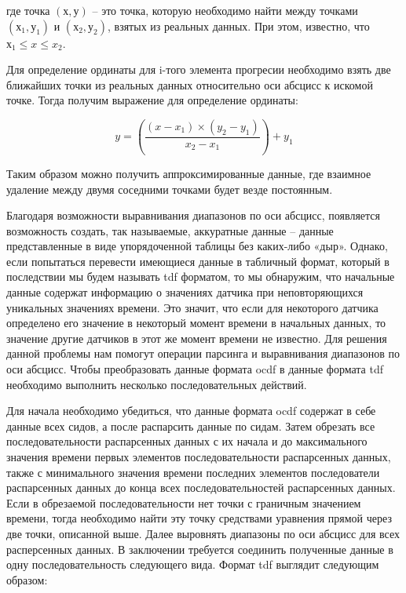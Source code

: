 {  \par \redline где точка $\left(х, у\right)$ – это точка, которую необходимо найти между точками $\left(х_1, у_1\right)$ и $\left(х_2, у_2\right)$, взятых из реальных данных. При этом, известно, что $х_1 \leq x \leq x_2$. 

  \par \redline Для определение ординаты для i-того элемента прогресии необходимо взять две ближайших точки из реальных данных относительно оси абсцисс к искомой точке. Тогда получим выражение для определение ординаты:

  \begin{equation} \tag{\thechaptercntr .\theformulacntr}
    y = \left(\frac{\left(x - x_1\right) \times \left(y_2 - y_1\right)}{x_2 - x_1}\right) + y_1
  \end{equation} \addtocounter{formulacntr}{1}

  \par \redline Таким образом можно получить аппроксимированные данные, где взаимное удаление между двумя соседними точками будет везде постоянным.  

  \par \redline Благодаря возможности выравнивания диапазонов по оси абсцисс, появляется возможность создать, так называемые, аккуратные данные – данные представленные в виде упорядоченной таблицы без каких-либо «дыр». Однако, если попытаться перевести имеющиеся данные в табличный формат, который в последствии мы будем называть tdf форматом, то мы обнаружим, что начальные данные содержат информацию о значениях датчика при неповторяющихся уникальных значениях времени. Это значит, что если для некоторого датчика определено его значение в некоторый момент времени в начальных данных, то значение другие датчиков в этот же момент времени не известно. Для решения данной проблемы нам помогут операции парсинга и выравнивания диапазонов по оси абсцисс. Чтобы преобразовать данные формата ocdf в данные формата tdf необходимо выполнить несколько последовательных действий. 

  \par \redline Для начала необходимо убедиться, что данные формата ocdf содержат в себе данные всех сидов, а после распарсить данные по сидам. Затем обрезать все последовательности распарсенных данных с их начала и до максимального значения времени первых элементов последовательности распарсенных данных, также с минимального значения времени последних элементов последователи распарсенных данных до конца всех последовательностей распарсенных данных. Если в обрезаемой последовательности нет точки с граничным значением времени, тогда необходимо найти эту точку средствами уравнения прямой через две точки, описанной выше. Далее выровнять диапазоны по оси абсцисс для всех расперсенных данных. В заключении требуется соединить полученные данные в одну последовательность следующего вида. Формат tdf выглядит следующим образом:

}
